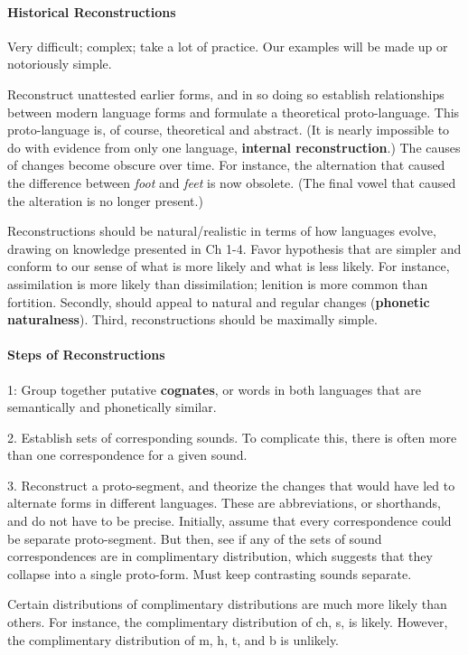 \documentclass{exam}
\begin{document}
\paragraph{Historical Reconstructions} Very difficult; complex; take a lot of practice. Our examples will be made up or notoriously simple. 

Reconstruct unattested earlier forms, and in so doing so establish relationships between modern language forms and formulate a theoretical proto-language. This proto-language is, of course, theoretical and abstract. (It is nearly impossible to do with evidence from only one language, \textbf{internal reconstruction}.) The causes of changes become obscure over time. For instance, the alternation that caused the difference between \textit{foot} and \textit{feet} is now obsolete. (The final vowel that caused the alteration is no longer present.)

Reconstructions should be natural/realistic in terms of how languages evolve, drawing on knowledge presented in Ch 1-4. Favor hypothesis that are simpler and conform to our sense of what is more likely and what is less likely. For instance, assimilation is more likely than dissimilation; lenition is more common than fortition. Secondly, should appeal to natural and regular changes (\textbf{phonetic naturalness}). Third, reconstructions should be maximally simple. 


\paragraph{Steps of Reconstructions}
1: Group together putative \textbf{cognates}, or words in both languages that are semantically and phonetically similar.

2. Establish sets of corresponding sounds. To complicate this, there is often more than one correspondence for a given sound. 

3. Reconstruct a proto-segment, and theorize the changes that would have led to alternate forms in different languages. These are abbreviations, or shorthands, and do not have to be precise. Initially, assume that every correspondence could be separate proto-segment. But then, see if any of the sets of sound correspondences are in complimentary distribution, which suggests that they collapse into a single proto-form. Must keep contrasting sounds separate. 



Certain distributions of complimentary distributions are much more likely than others. For instance, the complimentary distribution of ch, s,  is likely. However, the complimentary distribution of m, h, t,  and b is unlikely.
\end{document}
